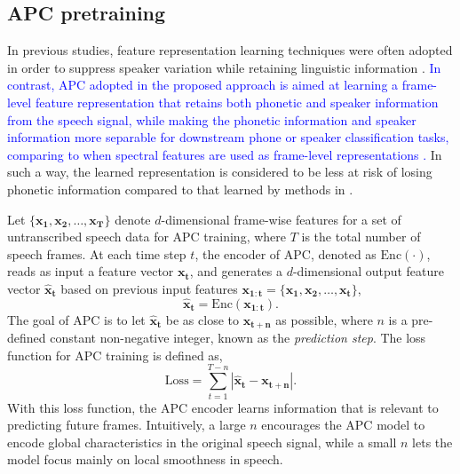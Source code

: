 \documentclass[transmag]{IEEEtran}
\begin{document}
\subsection{APC pretraining}
\label{subsec:approach_apc}
In previous studies, feature representation learning techniques were often adopted in order to suppress speaker variation while retaining linguistic information \cite{heck2017feature,feng2018exploiting,feng2019_TASLP}. 
\textcolor{blue}{In contrast, APC adopted in the proposed approach is aimed at learning a frame-level feature representation that retains both phonetic and speaker information from the speech signal, while making the phonetic information and  speaker information more separable for downstream  phone or speaker classification tasks, comparing to when spectral features are used as frame-level representations \cite{Chung2019}.}
In such a way, the learned representation is considered to be less at risk of losing phonetic information compared to that learned by methods in \cite{heck2017feature,feng2018exploiting,feng2019_TASLP}.

Let $\{\bm{x_1},\bm{x_2}, \ldots, \bm{x_T} \}$ denote $d$-dimensional frame-wise features for a set of untranscribed speech data for APC training, where $T$ is the total number of speech frames. 
At each time step $t$, the encoder of APC, denoted as $\mathrm{Enc} (\cdot)$, reads as input a feature vector $\bm{x_t}$, and generates a $d$-dimensional output feature vector $\bm{\hat{x}_t}$ based on 
previous input features $\bm{x_{1:t}} = \{\bm{x_1}, \bm{x_2}, \ldots, \bm{x_t}\}$, 
\begin{equation}
    \bm{\hat{x}_t} = \mathrm{Enc} (\bm{x_{1:t}}).\label{eqt:enc}
\end{equation}
The goal of APC is to let $\bm{\hat{x}_t}$ be as close to $\bm{x_{t+n}}$ as possible, where $n$ is a pre-defined constant non-negative integer, known as the \textit{prediction step}. The loss function for APC training is defined as,
\begin{equation}
    \mathrm{Loss} = \sum_{t=1}^{T-n} \left| \bm{\hat{x}_t}  - \bm{x_{t+n}}\right|.
\end{equation}
With this loss function, the APC encoder learns information that is relevant to predicting future frames. 
Intuitively, a large $n$ encourages the APC model to encode  global characteristics in the original speech signal, while a small $n$ lets the model   focus mainly on local smoothness in speech. 
\end{document}
